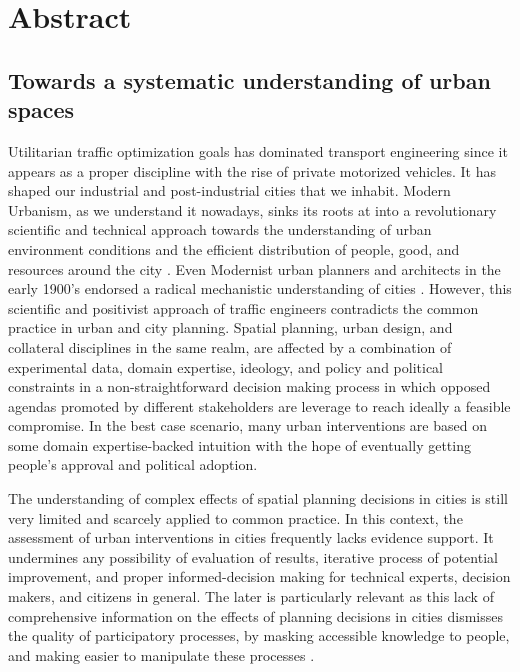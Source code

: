 \documentclass[11pt]{article}
\begin{document}
\section{Abstract}

\subsection {Towards a systematic understanding of urban spaces}

Utilitarian traffic optimization goals has dominated transport engineering since it appears as a proper discipline with the rise of private motorized vehicles. It has shaped our industrial and post-industrial cities that we inhabit. Modern Urbanism, as we understand it nowadays, sinks its roots at into a revolutionary scientific and technical approach towards the understanding of urban environment conditions and the efficient distribution of people, good, and resources around the city \citep{Cerda1867}. Even Modernist urban planners and architects in the early 1900's endorsed a radical mechanistic understanding of cities \citep{CIAM1933}. However, this scientific and positivist approach of traffic engineers contradicts the common practice in urban and city planning. Spatial planning, urban design, and collateral disciplines in the same realm, are affected by a combination of experimental data, domain expertise, ideology, and policy and political constraints in a non-straightforward decision making process in which opposed agendas promoted by different stakeholders are leverage to reach ideally a feasible compromise. In the best case scenario, many urban interventions are based on some domain expertise-backed intuition with the hope of eventually getting people's approval and political adoption.

The understanding of complex effects of spatial planning decisions in cities is still very limited and scarcely applied to common practice. In this context, the assessment of urban interventions in cities frequently lacks evidence support. It undermines any possibility of evaluation of results, iterative process of potential improvement, and proper informed-decision making for technical experts, decision makers, and citizens in general. The later is particularly relevant as this lack of comprehensive information on the effects of planning decisions in cities dismisses the quality of participatory processes, by masking accessible knowledge to people, and making easier to manipulate these processes \citep{Blundell-Jones2005} \citep{Plaza2020}.
\end{document}
